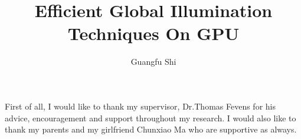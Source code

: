 \documentclass[12pt]{report}
\author{Guangfu Shi}
\title{Efficient Global Illumination Techniques On GPU}
\begin{document}

\begin{acknowledgments}
First of all, I would like to thank my supervisor, Dr.Thomas Fevens for his advice, encouragement and support throughout my research. I would also like to thank my parents and my girlfriend Chunxiao Ma who are supportive as always.
\end{acknowledgments}


\setcounter{page}{1}

\begin{spacing}{2.0}
	








	

		

%				



\end{spacing}
\end{document}
